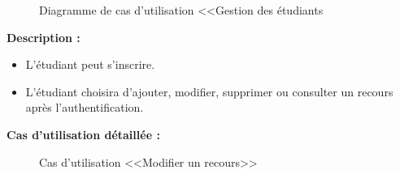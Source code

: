 \documentclass[12pt]{report}
\begin{document}
\newpage

\begin{figure}[h]
\centering
    \centerline{}
    \caption{Diagramme de cas d'utilisation <<Gestion des étudiants}
\end{figure}

\vspace{-0.25in}

\textbf{Description :}

\begin{itemize}
    \item L'étudiant peut s'inscrire.
    \item L'étudiant choisira d'ajouter, modifier, supprimer ou consulter un recours après l'authentification.
\end{itemize}

\vspace*{-0.05in}

\textbf{Cas d'utilisation détaillée :}

\vspace*{0.1in}

\begin{figure}[h]
\centering
    \centerline{}
    \caption{Cas d'utilisation <<Modifier un recours>>}
\end{figure}

\vspace*{-0.1in}
\end{document}
